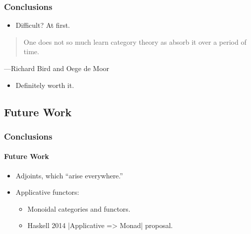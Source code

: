 \documentclass{beamer}
\begin{document}

\begin{frame}
  \frametitle{Conclusions}

  \begin{itemize}
  \item
    Difficult? At first.
  \end{itemize}
  \vfill
  \begin{quote}
    One does not so much learn category theory as absorb it over a
    period of time.
  \end{quote}
  \hfill ---Richard Bird and Oege de Moor \vfill
  \begin{itemize}
  \item
    Definitely worth it.
  \end{itemize}

\end{frame}


\subsection{Future Work}


\begin{frame}[fragile,label={future-work}]
  \frametitle{Conclusions}
  \framesubtitle{Future Work}

  \begin{itemize}
  \item
    Adjoints, which ``arise everywhere.''
  \end{itemize}
  \begin{itemize}
  \item
    Applicative functors:
    \begin{itemize}
    \item
      Monoidal categories and functors.
    \item
      Haskell 2014 |Applicative => Monad| proposal.
    \end{itemize}
  \end{itemize}

\end{frame}

\end{document}
